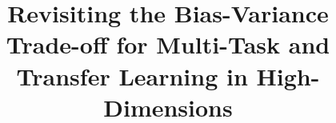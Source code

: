 \documentclass{article}
\begin{document}
\title{Revisiting the Bias-Variance Trade-off for Multi-Task and Transfer Learning in High-Dimensions}
\maketitle











\newpage
\appendix





\end{document}
